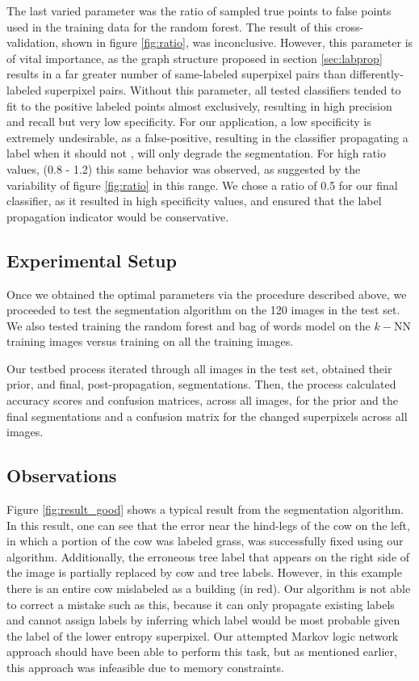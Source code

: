 \documentclass{article} %
\begin{document}
The last varied parameter was the ratio of sampled true points to false points used in the training data for the random forest.
The result of this cross-validation, shown in figure \ref{fig:ratio}, was inconclusive.
However, this parameter is of vital importance, as the graph structure proposed in section \ref{sec:labprop} results in a far greater number of same-labeled superpixel pairs than differently-labeled superpixel pairs.
Without this parameter, all tested classifiers tended to fit to the positive labeled points almost exclusively, resulting in high precision and recall but very low specificity. 
For our application, a low specificity is extremely undesirable, as a false-positive, resulting in the classifier propagating a label when it should not , will only degrade the segmentation. 
For high ratio values, (0.8 - 1.2) this same behavior was observed, as suggested by the variability of figure \ref{fig:ratio} in this range. We chose a ratio of 0.5 for our final classifier, as it resulted in high specificity values, and ensured that the label propagation indicator would be conservative. 

\subsection{Experimental Setup}

Once we obtained the optimal parameters via the procedure described above, we proceeded to test the segmentation algorithm on the 120 images in the test set. We also tested training the random forest and bag of words model on the $k-$NN training images versus training on all the training images.

Our testbed process iterated through all images in the test set, obtained their prior, and final, post-propagation, segmentations. Then, the process calculated accuracy scores and confusion matrices, across all images, for the prior and the final segmentations and a confusion matrix for the changed superpixels across all images. 

\subsection{Observations}
\label{sec:Observations}

Figure \ref{fig:result_good} shows a typical result from the segmentation algorithm. In this result, one can see that the error near the hind-legs of the cow on the left, in which a portion of the cow was labeled grass, was successfully fixed using our algorithm. Additionally, the erroneous tree label that appears on the right side of the image is partially replaced by cow and tree labels. However, in this example there is an entire cow mislabeled as a building (in red). Our algorithm is not able to correct a mistake such as this, because it can only propagate existing labels and cannot assign labels by inferring which label would be most probable given the label of the lower entropy superpixel. Our attempted Markov logic network approach should have been able to perform this task, but as mentioned earlier, this approach was infeasible due to memory constraints.
\end{document}
